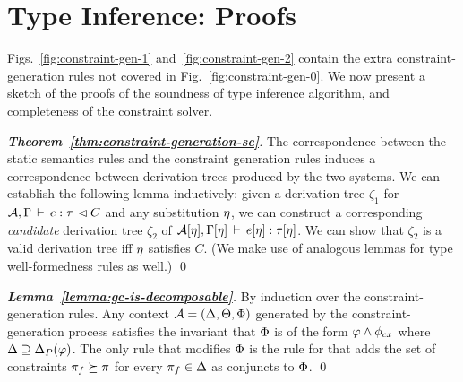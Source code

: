 \section{Type Inference: Proofs}

Figs.~\ref{fig:constraint-gen-1} and~\ref{fig:constraint-gen-2} contain the
extra constraint-generation rules not covered in Fig.~\ref{fig:constraint-gen-0}.
We now present a sketch of the proofs of the soundness of type
inference algorithm, and completeness of the constraint solver.


\begin{proof}[\textbf{Theorem~\ref{thm:constraint-generation-sc}}]
The correspondence between the static semantics rules and the constraint generation
rules induces a correspondence between derivation trees produced by the
two systems.
We can establish the following lemma inductively:
given a derivation tree $\zeta_1$ for
${{\mathcal{A}},\Gamma} \, \vdash \, {e} : {\tau} \, \lhd {C}$
and any substitution $\eta$,
we can construct a corresponding \emph{candidate} derivation
tree $\zeta_2$ of ${\mathcal{A}}[\eta],\Gamma[\eta]\,\vdash\,e[\eta]:\tau[\eta]$.
We can show that $\zeta_2$ is a valid derivation tree iff $\eta$ satisfies $C$.
(We make use of analogous lemmas for type well-formedness rules as well.)
\qed
\end{proof}


\begin{proof}[\textbf{Lemma~\ref{lemma:gc-is-decomposable}}]
  By induction over the constraint-generation rules.
  Any context ${\mathcal{A}} = (\Delta,\Theta,\Phi)$ generated by the constraint-generation
  process satisfies the invariant that $\Phi$ is of the form $\varphi \wedge \phi_{cx}$
  where $\Delta \supseteq {\Delta_P}(\varphi)$.
  The only rule that modifies $\Phi$ is the rule for 
  that adds the set of constraints $\pi_f \succeq \pi$ for every $\pi_f \in \Delta$
  as conjuncts to $\Phi$.
\qed
\end{proof}

